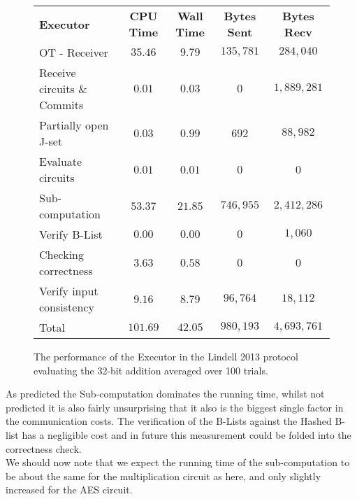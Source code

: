 \documentclass[ %
                    author={Nicholas Tutte},
                supervisor={Prof. Nigel Smart},
                    degree={MEng},
                     title={Secure Two Party Computation},
                  subtitle={A practical comparison of recent protocols},
                      type={Research - GG1K},
                      year={2015} ]{dissertation}
\begin{document}
				\begin{figure}[!ht]
					\begin{tabular}{| p{4.3cm} | c c c c |}
						\hline
						\textbf{Executor} & \textbf{CPU Time} & \textbf{Wall Time} & \textbf{Bytes Sent} & \textbf{Bytes Recv} \\
						\thickhline
						OT - Receiver & $35.46$ & $9.79$ & $135,781$ & $284,040$ \\
						\hline
						Receive circuits \& Commits & $0.01$ & $0.03$ & $0$ & $1,889,281$ \\
						\hline
						Partially open J-set & $0.03$ & $0.99$ & $692$ & $88,982$ \\
						\hline
						Evaluate circuits & $0.01$ & $0.01$ & $0$ & $0$ \\
						\hline
						Sub-computation & $53.37$ & $21.85$ & $746,955$ & $2,412,286$ \\
						\hline
						Verify B-List & $0.00$ & $0.00$ & $0$ & $1,060$ \\
						\hline
						Checking correctness & $3.63$ & $0.58$ & $0$ & $0$ \\
						\hline
						Verify input consistency & $9.16$ & $8.79$ & $96,764$ & $18,112$ \\
						\thickhline
						Total & $101.69$ & $42.05$ & $980,193$ & $4,693,761$ \\
						\hline
					\end{tabular}
					\caption{The performance of the Executor in the Lindell 2013 protocol evaluating the 32-bit addition averaged over 100 trials. \label{table:L_2013_Add_Executor}}
				\end{figure}
				\FloatBarrier

				As predicted the Sub-computation dominates the running time, whilst not predicted it is also fairly unsurprising that it also is the biggest single factor in the communication costs. The verification of the B-Lists against the Hashed B-list has a negligible cost and in future this measurement could be folded into the correctness check.\\

				We should now note that we expect the running time of the sub-computation to be about the same for the multiplication circuit as here, and only slightly increased for the AES circuit.\\
\end{document}
